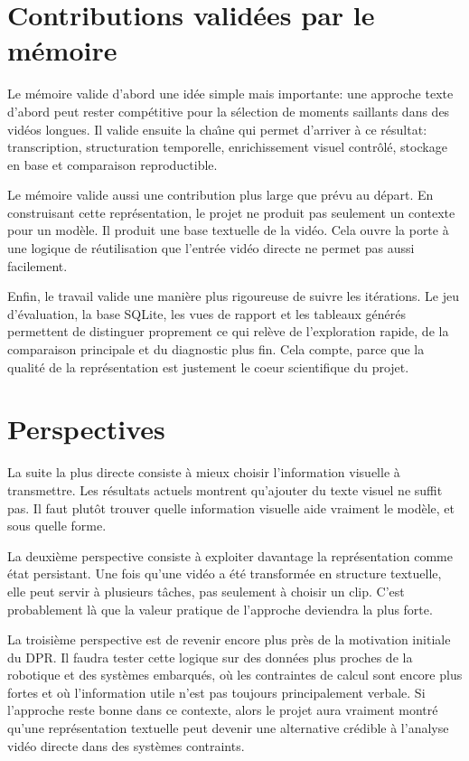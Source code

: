\section{Contributions valid\'ees par le m\'emoire}

Le m\'emoire valide d'abord une id\'ee simple mais importante: une approche texte d'abord peut rester comp\'etitive pour la s\'election de moments saillants dans des vid\'eos longues. Il valide ensuite la cha\^\i ne qui permet d'arriver \`a ce r\'esultat: transcription, structuration temporelle, enrichissement visuel contr\^ol\'e, stockage en base et comparaison reproductible.

Le m\'emoire valide aussi une contribution plus large que pr\'evu au d\'epart. En construisant cette repr\'esentation, le projet ne produit pas seulement un contexte pour un mod\`ele. Il produit une base textuelle de la vid\'eo. Cela ouvre la porte \`a une logique de r\'eutilisation que l'entr\'ee vid\'eo directe ne permet pas aussi facilement.

Enfin, le travail valide une mani\`ere plus rigoureuse de suivre les it\'erations. Le jeu d'\'evaluation, la base SQLite, les vues de rapport et les tableaux g\'en\'er\'es permettent de distinguer proprement ce qui rel\`eve de l'exploration rapide, de la comparaison principale et du diagnostic plus fin. Cela compte, parce que la qualit\'e de la repr\'esentation est justement le coeur scientifique du projet.

\section{Perspectives}

La suite la plus directe consiste \`a mieux choisir l'information visuelle \`a transmettre. Les r\'esultats actuels montrent qu'ajouter du texte visuel ne suffit pas. Il faut plut\^ot trouver quelle information visuelle aide vraiment le mod\`ele, et sous quelle forme.

La deuxi\`eme perspective consiste \`a exploiter davantage la repr\'esentation comme \'etat persistant. Une fois qu'une vid\'eo a \'et\'e transform\'ee en structure textuelle, elle peut servir \`a plusieurs t\^aches, pas seulement \`a choisir un clip. C'est probablement l\`a que la valeur pratique de l'approche deviendra la plus forte.

La troisi\`eme perspective est de revenir encore plus pr\`es de la motivation initiale du DPR. Il faudra tester cette logique sur des donn\'ees plus proches de la robotique et des syst\`emes embarqu\'es, o\`u les contraintes de calcul sont encore plus fortes et o\`u l'information utile n'est pas toujours principalement verbale. Si l'approche reste bonne dans ce contexte, alors le projet aura vraiment montr\'e qu'une repr\'esentation textuelle peut devenir une alternative cr\'edible \`a l'analyse vid\'eo directe dans des syst\`emes contraints.
